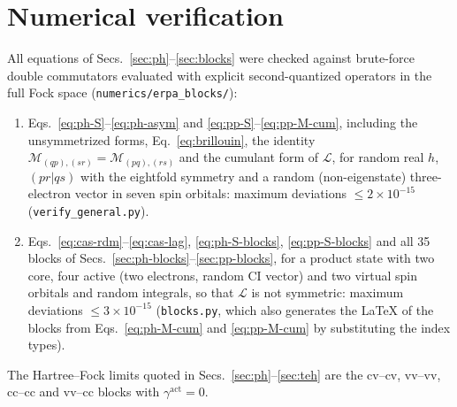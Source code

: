 \documentclass[aip,jcp,reprint,noshowkeys,superscriptaddress]{revtex4-1}
\newcommand{\Lag}{\mathcal{L}}
\newcommand{\act}{\mathrm{act}}
\newcommand{\scv}{\text{cv}}
\newcommand{\svv}{\text{vv}}
\newcommand{\scc}{\text{cc}}
\begin{document}
\section{Numerical verification}
\label{sec:verification}

All equations of Secs.~\ref{sec:ph}--\ref{sec:blocks} were checked against
brute-force double commutators evaluated with explicit second-quantized
operators in the full Fock space (\texttt{numerics/erpa\_blocks/}):
\begin{enumerate}
\item[(a)] Eqs.~\eqref{eq:ph-S}--\eqref{eq:ph-asym} and
  \eqref{eq:pp-S}--\eqref{eq:pp-M-cum}, including the unsymmetrized forms,
  Eq.~\eqref{eq:brillouin}, the identity $\mathcal M_{(qp),(sr)}=\mathcal M_{(pq),(rs)}$
  and the cumulant form of $\Lag$, for random real $h$, $(pr|qs)$ with the
  eightfold symmetry and a random (non-eigenstate) three-electron vector in
  seven spin orbitals: maximum deviations $\le 2\times10^{-15}$
  (\texttt{verify\_general.py}).
\item[(b)] Eqs.~\eqref{eq:cas-rdm}--\eqref{eq:cas-lag}, \eqref{eq:ph-S-blocks},
  \eqref{eq:pp-S-blocks} and all 35 blocks of
  Secs.~\ref{sec:ph-blocks}--\ref{sec:pp-blocks}, for a product state with
  two core, four active (two electrons, random CI vector) and two virtual spin
  orbitals and random integrals, so that $\Lag$ is not symmetric: maximum
  deviations $\le 3\times10^{-15}$ (\texttt{blocks.py}, which also generates
  the \LaTeX{} of the blocks from Eqs.~\eqref{eq:ph-M-cum} and
  \eqref{eq:pp-M-cum} by substituting the index types).
\end{enumerate}
The Hartree--Fock limits quoted in Secs.~\ref{sec:ph}--\ref{sec:teh} are the
$\scv$--$\scv$, $\svv$--$\svv$, $\scc$--$\scc$ and $\svv$--$\scc$ blocks with
$\gamma^{\act}=0$.


\end{document}
